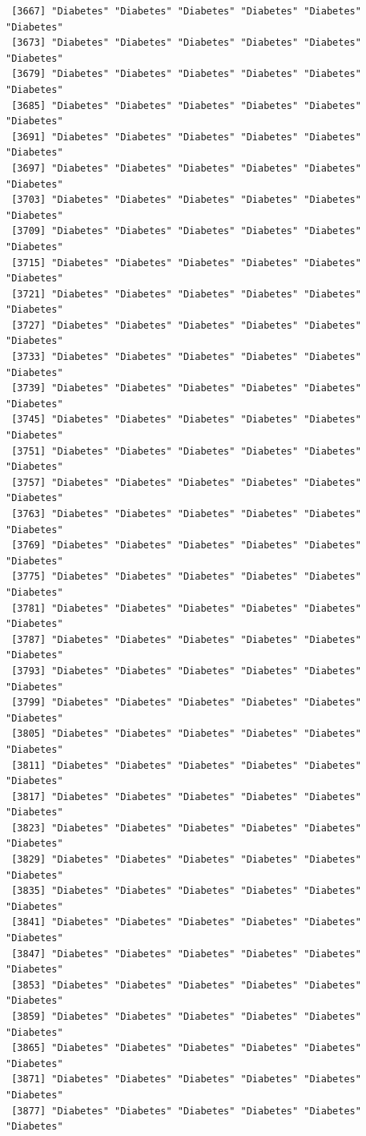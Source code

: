 \documentclass[
  letterpaper,
  DIV=11,
  numbers=noendperiod]{scrartcl}
\begin{document}
\begin{verbatim}
 [3667] "Diabetes" "Diabetes" "Diabetes" "Diabetes" "Diabetes" "Diabetes"
 [3673] "Diabetes" "Diabetes" "Diabetes" "Diabetes" "Diabetes" "Diabetes"
 [3679] "Diabetes" "Diabetes" "Diabetes" "Diabetes" "Diabetes" "Diabetes"
 [3685] "Diabetes" "Diabetes" "Diabetes" "Diabetes" "Diabetes" "Diabetes"
 [3691] "Diabetes" "Diabetes" "Diabetes" "Diabetes" "Diabetes" "Diabetes"
 [3697] "Diabetes" "Diabetes" "Diabetes" "Diabetes" "Diabetes" "Diabetes"
 [3703] "Diabetes" "Diabetes" "Diabetes" "Diabetes" "Diabetes" "Diabetes"
 [3709] "Diabetes" "Diabetes" "Diabetes" "Diabetes" "Diabetes" "Diabetes"
 [3715] "Diabetes" "Diabetes" "Diabetes" "Diabetes" "Diabetes" "Diabetes"
 [3721] "Diabetes" "Diabetes" "Diabetes" "Diabetes" "Diabetes" "Diabetes"
 [3727] "Diabetes" "Diabetes" "Diabetes" "Diabetes" "Diabetes" "Diabetes"
 [3733] "Diabetes" "Diabetes" "Diabetes" "Diabetes" "Diabetes" "Diabetes"
 [3739] "Diabetes" "Diabetes" "Diabetes" "Diabetes" "Diabetes" "Diabetes"
 [3745] "Diabetes" "Diabetes" "Diabetes" "Diabetes" "Diabetes" "Diabetes"
 [3751] "Diabetes" "Diabetes" "Diabetes" "Diabetes" "Diabetes" "Diabetes"
 [3757] "Diabetes" "Diabetes" "Diabetes" "Diabetes" "Diabetes" "Diabetes"
 [3763] "Diabetes" "Diabetes" "Diabetes" "Diabetes" "Diabetes" "Diabetes"
 [3769] "Diabetes" "Diabetes" "Diabetes" "Diabetes" "Diabetes" "Diabetes"
 [3775] "Diabetes" "Diabetes" "Diabetes" "Diabetes" "Diabetes" "Diabetes"
 [3781] "Diabetes" "Diabetes" "Diabetes" "Diabetes" "Diabetes" "Diabetes"
 [3787] "Diabetes" "Diabetes" "Diabetes" "Diabetes" "Diabetes" "Diabetes"
 [3793] "Diabetes" "Diabetes" "Diabetes" "Diabetes" "Diabetes" "Diabetes"
 [3799] "Diabetes" "Diabetes" "Diabetes" "Diabetes" "Diabetes" "Diabetes"
 [3805] "Diabetes" "Diabetes" "Diabetes" "Diabetes" "Diabetes" "Diabetes"
 [3811] "Diabetes" "Diabetes" "Diabetes" "Diabetes" "Diabetes" "Diabetes"
 [3817] "Diabetes" "Diabetes" "Diabetes" "Diabetes" "Diabetes" "Diabetes"
 [3823] "Diabetes" "Diabetes" "Diabetes" "Diabetes" "Diabetes" "Diabetes"
 [3829] "Diabetes" "Diabetes" "Diabetes" "Diabetes" "Diabetes" "Diabetes"
 [3835] "Diabetes" "Diabetes" "Diabetes" "Diabetes" "Diabetes" "Diabetes"
 [3841] "Diabetes" "Diabetes" "Diabetes" "Diabetes" "Diabetes" "Diabetes"
 [3847] "Diabetes" "Diabetes" "Diabetes" "Diabetes" "Diabetes" "Diabetes"
 [3853] "Diabetes" "Diabetes" "Diabetes" "Diabetes" "Diabetes" "Diabetes"
 [3859] "Diabetes" "Diabetes" "Diabetes" "Diabetes" "Diabetes" "Diabetes"
 [3865] "Diabetes" "Diabetes" "Diabetes" "Diabetes" "Diabetes" "Diabetes"
 [3871] "Diabetes" "Diabetes" "Diabetes" "Diabetes" "Diabetes" "Diabetes"
 [3877] "Diabetes" "Diabetes" "Diabetes" "Diabetes" "Diabetes" "Diabetes"

\end{verbatim}
\end{document}
